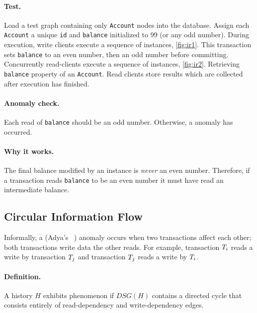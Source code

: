 \paragraph{Test.}
Load a test graph containing only \texttt{Account} nodes into the database.
Assign each \texttt{Account} a unique \texttt{id} and \texttt{balance}
initialized to 99 (or any odd number). During execution, write clients execute a
sequence of  instances, \autoref{fig:ir1}. This
transaction sets \texttt{balance} to an even number, then an odd number before
committing. Concurrently read-clients execute a sequence of
 instances, \autoref{fig:ir2}. Retrieving
\texttt{balance} property of an \texttt{Account}. Read clients store results
which are collected after execution has finished.

\paragraph{Anomaly check.}
Each read of \texttt{balance} should be an odd number.
Otherwise, a  anomaly has occurred.

\paragraph{Why it works.}
The final balance modified by an  instance is
\emph{never} an even number. Therefore, if a transaction reads \texttt{balance}
to be an even number it must have read an intermediate balance.

\subsection*{Circular Information Flow}

Informally, a  (Adya's ~\cite{adya1999weak})
anomaly occurs when two transactions affect each other; \ie both transactions
write data the other reads. For example, transaction $T_i$ reads a
write by transaction $T_j$ and transaction $T_j$ reads a write by $T_i$.

\paragraph{Definition.}
A history $H$ exhibits phenomenon  if $\textit{DSG}(H)$ contains a
directed cycle that consists entirely of read-dependency and write-dependency edges.

